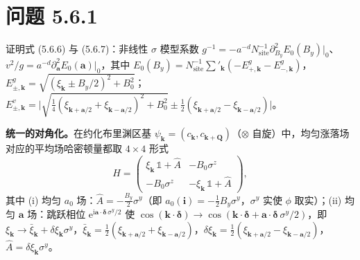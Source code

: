\section*{问题 5.6.1}
\begin{problem}
证明式 (5.6.6) 与 (5.6.7)：非线性 $\sigma$ 模型系数 $g^{-1}=-a^{-d}N_{\mathrm{site}}^{-1}\partial^{2}_{B_y}E_0(B_y)|_0$、$v^{2}/g=a^{-d}\partial^{2}_{\pmb a}E_0(\pmb a)|_0$，其中 $E_0(B_y)=N_{\mathrm{site}}^{-1}\sum'_{\pmb k}(-E^{g}_{+,\pmb k}-E^{g}_{-,\pmb k})$，$E^{g}_{\pm,\pmb k}=\sqrt{(\xi_{\pmb k}\pm B_y/2)^{2}+B_0^{2}}$；$E^{v}_{\pm,\pmb k}=\big|\sqrt{\frac14(\xi_{\pmb k+\pmb a/2}+\xi_{\pmb k-\pmb a/2})^{2}+B_0^{2}}\pm\frac12(\xi_{\pmb k+\pmb a/2}-\xi_{\pmb k-\pmb a/2})\big|$。
\end{problem}
\solution

\textbf{统一的对角化。}在约化布里渊区基 $\psi_{\pmb k}=(c_{\pmb k},c_{\pmb k+\pmb Q})$（$\otimes$ 自旋）中，均匀涨落场对应的平均场哈密顿量都取 $4\times4$ 形式
\begin{equation*}
H=\begin{pmatrix}
\xi_{\pmb k}\,\mathbb 1+\hat A & -B_0\sigma^{z}\\[2pt]
-B_0\sigma^{z} & -\xi_{\pmb k}\,\mathbb 1+\hat A
\end{pmatrix},
\end{equation*}
其中 (i) 均匀 $a_0$ 场：$\hat A=-\frac{B_y}{2}\sigma^{y}$（即 $a_0(\pmb i)=-\frac12B_y\sigma^{y}$，$\sigma^{y}$ 实使 $\phi$ 取实）；(ii) 均匀 $\pmb a$ 场：跳跃相位 $\mathrm{e}^{\mathrm{i}\pmb a\cdot\pmb\delta\,\sigma^{y}/2}$ 使 $\cos(\pmb k\cdot\pmb\delta)\to\cos(\pmb k\cdot\pmb\delta+\pmb a\cdot\pmb\delta\,\sigma^{y}/2)$，即 $\xi_{\pmb k}\to\bar\xi_{\pmb k}+\delta\xi_{\pmb k}\sigma^{y}$，$\bar\xi_{\pmb k}=\frac12(\xi_{\pmb k+\pmb a/2}+\xi_{\pmb k-\pmb a/2})$，$\delta\xi_{\pmb k}=\frac12(\xi_{\pmb k+\pmb a/2}-\xi_{\pmb k-\pmb a/2})$，$\hat A=\delta\xi_{\pmb k}\sigma^{y}$。

